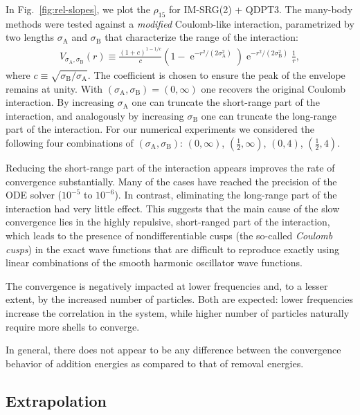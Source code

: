 \documentclass[aip, jcp, 12pt]{revtex4-1}
\newcommand{\E}{\operatorname{e}}
\begin{document}
In Fig.\ \ref{fig:rel-slopes}, we plot the $\rho_{15}$ for IM-SRG(2) + QDPT3.  The many-body methods were tested against a \emph{modified} Coulomb-like interaction, parametrized by two lengths $\sigma_{\mathrm{A}}$ and $\sigma_{\mathrm{B}}$ that characterize the range of the interaction:
\begin{align}
  V_{\sigma_{\mathrm{A}}, \sigma_{\mathrm{B}}}(r) \equiv \frac{(1 + c)^{1 - 1/c}}{c} \left(1 - \E^{-r^2 / (2 \sigma_{\mathrm{A}}^2)}\right) \E^{-r^2 / (2 \sigma_{\mathrm{B}}^2)} \frac{1}{r},
\end{align}
where $c \equiv \sqrt{\sigma_{\mathrm{B}} / \sigma_{\mathrm{A}}}$.  The coefficient is chosen to ensure the peak of the envelope remains at unity.  With $(\sigma_{\mathrm{A}}, \sigma_{\mathrm{B}}) = (0, \infty)$ one recovers the original Coulomb interaction.  By increasing $\sigma_{\mathrm{A}}$ one can truncate the short-range part of the interaction, and analogously by increasing $\sigma_{\mathrm{B}}$ one can truncate the long-range part of the interaction.  For our numerical experiments we considered the following four combinations of $(\sigma_{\mathrm{A}}, \sigma_{\mathrm{B}})$: $(0, \infty)$, $(\frac{1}{2}, \infty)$, $(0, 4)$, $(\frac{1}{2}, 4)$.

Reducing the short-range part of the interaction appears improves the rate of convergence substantially.  Many of the cases have reached the precision of the ODE solver ($10^{-5}$ to $10^{-6}$).  In contrast, eliminating the long-range part of the interaction had very little effect.  This suggests that the main cause of the slow convergence lies in the highly repulsive, short-ranged part of the interaction, which leads to the presence of nondifferentiable cusps (the so-called \textit{Coulomb cusps}) in the exact wave functions that are difficult to reproduce exactly using linear combinations of the smooth harmonic oscillator wave functions.

The convergence is negatively impacted at lower frequencies and, to a lesser extent, by the increased number of particles.  Both are expected: lower frequencies increase the correlation in the system, while higher number of particles naturally require more shells to converge.

In general, there does not appear to be any difference between the convergence behavior of addition energies as compared to that of removal energies.

\subsection{Extrapolation}
\label{subsec:extrapolation}
\end{document}
